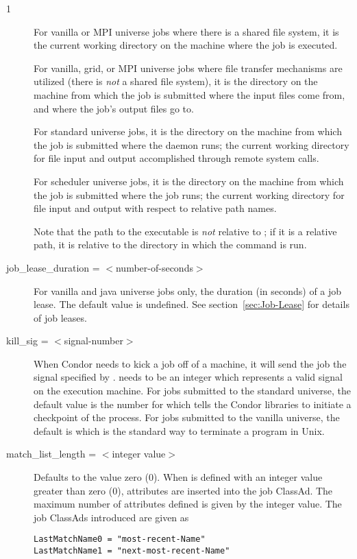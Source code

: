 \begin{ManPage}{\label{man-condor-submit}}{1}
\begin{description}
For vanilla or MPI universe jobs where there is a shared file system,
it is the current working directory on the machine where the
job is executed.

For vanilla, grid, or MPI universe jobs where file transfer mechanisms are
utilized (there is \emph{not} a shared file system),
it is the directory on the machine from which the job is submitted
where the input files come from, and where the job's output
files go to.

For standard universe jobs,
it is the directory on the machine from which the job is submitted
where the  daemon runs;
the current working directory for file input and output accomplished
through remote system calls.

For scheduler universe jobs,
it is the directory on the machine from which the job is submitted
where the job runs;
the current working directory for file input and output with
respect to relative path names.

Note that the path to the executable is \emph{not} relative to
; if it is a relative path, it is relative to the
directory in which the  command is run.


\item[job\_lease\_duration = $<$number-of-seconds$>$] For vanilla
and java universe jobs only, the duration (in seconds) of a
job lease.  The default value is undefined.
See section~\ref{sec:Job-Lease} for details of job leases.



\item[kill\_sig = $<$signal-number$>$] When Condor needs to kick a job
off of a machine, it will send the job the signal specified by
.   needs to be an integer which
represents a valid signal on the execution machine.  For jobs submitted
to the standard universe, the default value is the number for
\verb@SIGTSTP@ which tells the Condor libraries to initiate a checkpoint
of the process.  For jobs submitted to the vanilla universe,
the default 
is \verb@SIGTERM@ which is the standard way to terminate a program in Unix.  


\item[match\_list\_length = $<$integer value$>$]
Defaults to the value zero (0).
When  is defined with an integer value
greater than zero (0),
attributes are inserted into the job ClassAd.
The maximum number of attributes defined is given by the integer
value.
The job ClassAds introduced are given as
\begin{verbatim}
LastMatchName0 = "most-recent-Name"
LastMatchName1 = "next-most-recent-Name"
\end{verbatim}


\end{description}
\end{ManPage}
